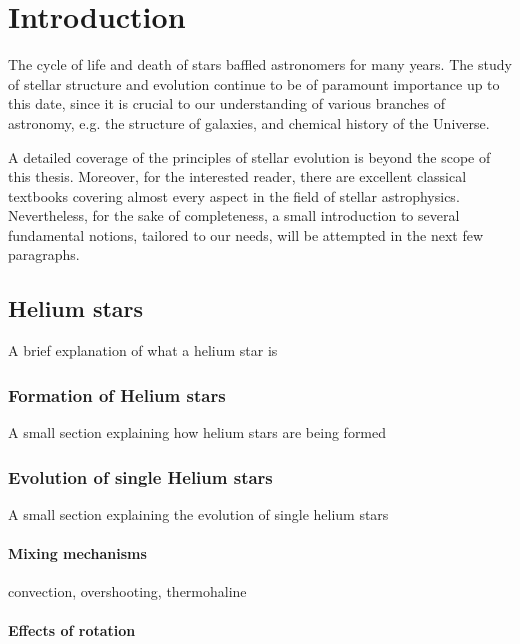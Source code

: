 \documentclass[../../main/thesis_msc.tex]{subfiles}
\begin{document}
    \chapter{Introduction}
    
		The cycle of life and death of stars  baffled astronomers for many years. The study of stellar structure and evolution continue to be of paramount importance up to this date, since it is crucial to our understanding of various branches of astronomy, e.g. the structure of galaxies, and chemical history of the Universe.
		
		A detailed coverage of the principles of stellar evolution is beyond the scope of this thesis. Moreover, for the interested reader, there are excellent classical textbooks \citep{Kipp_book, Clayton} covering almost every aspect in the field of stellar astrophysics. Nevertheless, for the sake of completeness, a small introduction to several fundamental notions, tailored to our needs, will be attempted in the next few paragraphs. 
		
    
    
    \section{Helium stars}
    	
    	A brief explanation of what a helium star is


			\subsection{Formation of Helium stars}
			
				A small section explaining how helium stars are being formed
				
			
			\subsection{Evolution of single Helium stars}
			
				A small section explaining the evolution of single helium stars    	
				
					\subsubsection{Mixing mechanisms}
					
						convection, overshooting, thermohaline
						
					\subsubsection{Effects of rotation}
					
\end{document}
